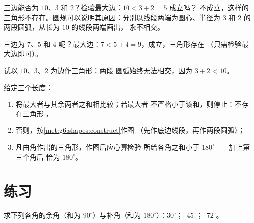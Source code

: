 \begin{example}\label{ex:g7:triangles:inequality}
三边能否为 $10$、$3$ 和 $2$？检验最大边：$10 < 3 + 2 = 5$ 成立吗？
不成立，这样的三角形不存在。圆规可以说明其原因：分别以线段两端为圆心、半径为
$3$ 和 $2$ 的两段圆弧，从长为 $10$ 的线段两端画出，
永不相交。

三边为 $7$、$5$ 和 $4$ 呢？最大边：$7 < 5 + 4 = 9$，成立，三角形存在
（只需检验最大边即可）。
\end{example}

\begin{omfigure}

{\small 试以 $10$、$3$、$2$ 为边作三角形：两段
圆弧始终无法相交，因为 $3 + 2 < 10$。}
\end{omfigure}

\begin{method}[三角形的存在性与作图]\label{met:g7:triangles:construct}
给定三个长度：
\begin{enumerate}
  \item 将最大者与其余两者之和相比较；若最大者
        不严格小于该和，则停止：不存在三角形；
  \item 否则，按\cref{met:g6:shapes:construct}作图
        （先作底边线段，再作两段圆弧）；
  \item 凡由角作出的三角形，作图后应心算检验
        所给各角之和小于 $180^\circ$——加上第三个角后
        恰为 $180^\circ$。
\end{enumerate}
\end{method}

\section{练习}

\begin{exercise}[$\star$]\label{exo:g7:triangles:1}
求下列各角的余角（和为 $90^\circ$）与补角（和为
$180^\circ$）：$30^\circ$；\ $45^\circ$；\ $72^\circ$。
\end{exercise}

